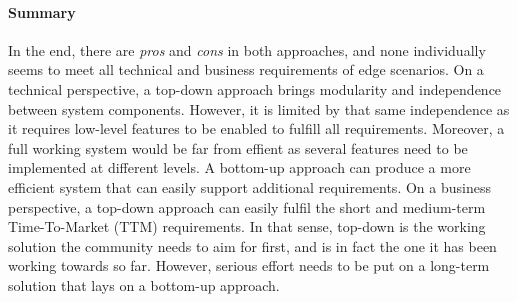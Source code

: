 
\paragraph{Summary}
In the end, there are \emph{pros} and \emph{cons} in both approaches, and none individually seems to meet all technical and business requirements of edge scenarios.
On a technical perspective, a top-down approach brings modularity and independence between system components. However, it is limited by that same independence as it requires low-level features to be enabled to fulfill all requirements. Moreover, a full working system would be far from effient as several features need to be implemented at different levels.
A bottom-up approach can produce a more efficient system that can easily support additional requirements.
On a business perspective, a top-down approach can easily fulfil the short and medium-term Time-To-Market (TTM) requirements. In that sense, top-down is the working solution the community needs to aim for first, and is in fact the one it has been working towards so far. However, serious effort needs to be put on a long-term solution that lays on a bottom-up approach.





